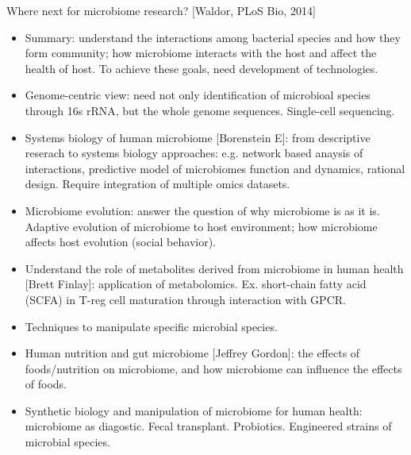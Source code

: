 \documentclass{report}
\begin{document}
Where next for microbiome research? [Waldor, PLoS Bio, 2014]
\begin{itemize}
\item Summary: understand the interactions among bacterial species and how they form community; how microbiome interacts with the host and affect the health of host. To achieve these goals, need development of technologies. 

\item Genome-centric view: need not only identification of microbioal species through 16s rRNA, but the whole genome sequences. Single-cell sequencing. 

\item Systems biology of human microbiome [Borenstein E]: from descriptive reserach to systems biology approaches: e.g. network based anaysis of interactions, predictive model of microbiomes function and dynamics, rational design. Require integration of multiple omics datasets. 

\item Microbiome evolution: answer the question of why microbiome is as it is. Adaptive evolution of microbiome to host environment; how microbiome affects host evolution (social behavior). 

\item Understand the role of metabolites derived from microbiome in human health [Brett Finlay]: application of metabolomics. Ex. short-chain fatty acid (SCFA) in T-reg cell maturation through interaction with GPCR. 

\item Techniques to manipulate specific microbial species. 

\item Human nutrition and gut microbiome [Jeffrey Gordon]: the effects of foods/nutrition on microbiome, and how microbiome can influence the effects of foods. 

\item Synthetic biology and manipulation of microbiome for human health: microbiome as diagostic. Fecal transplant. Probiotics. Engineered strains of microbial species. 	
\end{itemize}
\end{document}
